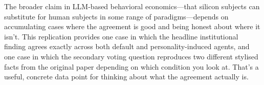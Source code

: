 \documentclass[12pt, a4paper]{article}
\begin{document}
The broader claim in LLM-based behavioral economics---that silicon subjects can substitute for human subjects in some range of paradigms---depends on accumulating cases where the agreement is good and being honest about where it isn't. This replication provides one case in which the headline institutional finding agrees exactly across both default and personality-induced agents, and one case in which the secondary voting question reproduces two different stylised facts from the original paper depending on which condition you look at. That's a useful, concrete data point for thinking about what the agreement actually is.



\end{document}
